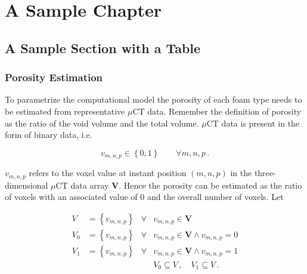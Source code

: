 %
%
%

\chapter{A Sample Chapter}

\section{A Sample Section with a Table}

\subsection{Porosity Estimation}

To parametrize the computational model the porosity of each foam type needs to be estimated from representative $\mu\text{CT}$ data. Remember the definition of porosity as the ratio of the void volume and the total volume. $\mu\text{CT}$ data is present in the form of binary data, i.e.

\begin{equation}
   v_{m,n,p}\in\left\{0,1\right\}\qquad\forall m,n,p\,.
\end{equation}

\noindent $v_{m,n,p}$ refers to the voxel value at instant position $\left(m,n,p\right)$ in the three-dimensional $\mu\text{CT}$ data array ${\mathbf V}$. Hence the porosity can be estimated as the ratio of voxels with an associated value of 0 and the overall number of voxels. Let

\begin{align*}
   V&=\left\{v_{m,n,p}\right\} & \forall & v_{m,n,p}\in {\mathbf V} \\
   V_0&=\left\{v_{m,n,p}\right\} & \forall & v_{m,n,p}\in {\mathbf V}\wedge v_{m,n,p}=0 \\
   V_1&=\left\{v_{m,n,p}\right\} & \forall & v_{m,n,p}\in {\mathbf V}\wedge v_{m,n,p}=1 \\
   & & & V_0 \subseteq V\,,\quad V_1 \subseteq V\,.
\end{align*}

